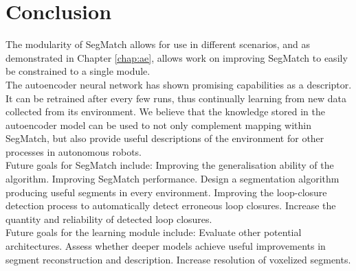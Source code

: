 \chapter{Conclusion}
\label{chap:conclusion}

The modularity of SegMatch allows for use in different scenarios, and as demonstrated in Chapter \ref{chap:ae}, allows work on improving SegMatch to easily be constrained to a single module.\\

The autoencoder neural network has shown promising capabilities as a descriptor. It can be retrained after every few runs, thus continually learning from new data collected from its environment. We believe that the knowledge stored in the autoencoder model can be used to not only complement mapping within SegMatch, but also provide useful descriptions of the environment for other processes in autonomous robots.\\

Future goals for SegMatch include: Improving the generalisation ability of the algorithm. Improving SegMatch performance. Design a segmentation algorithm producing useful segments in every environment. Improving the loop-closure detection process to automatically detect erroneous loop closures. Increase the quantity and reliability of detected loop closures.\\

Future goals for the learning module include: Evaluate other potential architectures. Assess whether deeper models achieve useful improvements in segment reconstruction and description. Increase resolution of voxelized segments.\\
